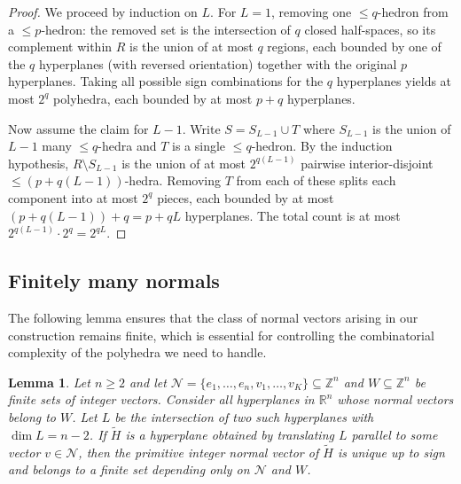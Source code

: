 \documentclass[10pt,a4paper]{amsart}
\newtheorem{lemma}[theorem]{Lemma}
\begin{document}
\begin{proof}
We proceed by induction on $L$. For $L=1$, removing one $\leq\!\! q$-hedron
from a $\leq\!\! p$-hedron: the removed set is the intersection of $q$ closed
half-spaces, so its complement within $R$ is the union of at most $q$
regions, each bounded by one of the $q$ hyperplanes (with reversed
orientation) together with the original $p$ hyperplanes. Taking all
possible sign combinations for the $q$ hyperplanes yields at most $2^q$
polyhedra, each bounded by at most $p+q$ hyperplanes.

Now assume the claim for $L-1$. Write $S=S_{L-1}\cup T$ where $S_{L-1}$
is the union of $L-1$ many $\leq\!\! q$-hedra and $T$ is a single
$\leq\!\! q$-hedron. By the induction hypothesis, $R\setminus S_{L-1}$ is the
union of at most $2^{q(L-1)}$ pairwise interior-disjoint
$\leq\!\! (p+q(L-1))$-hedra. Removing $T$ from each of these splits each
component into at most $2^q$ pieces, each bounded by at most
$(p+q(L-1))+q=p+qL$ hyperplanes. The total count is at most
$2^{q(L-1)}\cdot 2^q=2^{qL}$.
\end{proof}

\subsection{Finitely many normals}

The following lemma ensures that the class of normal vectors arising in
our construction remains finite, which is essential for controlling the
combinatorial complexity of the polyhedra we need to handle.

\begin{lemma}\label{lem:finite_normals}
Let $n\geq 2$ and let
$\mathcal{N}=\{e_1,\dots,e_n, v_1,\dots,v_K\}\subseteq\mathbb{Z}^n$ and
$W\subseteq\mathbb{Z}^n$ be finite sets of integer vectors. Consider all hyperplanes in $\mathbb{R}^n$ whose normal vectors
belong to $W$. Let $L$ be the intersection of two such hyperplanes with
$\dim L=n-2$. If $\widetilde{H}$ is a hyperplane obtained by translating
$L$ parallel to some vector $v\in\mathcal{N}$, then the primitive integer
normal vector of $\widetilde{H}$ is unique up to sign and belongs to a
finite set depending only on $\mathcal{N}$ and $W$.
\end{lemma}
\end{document}
